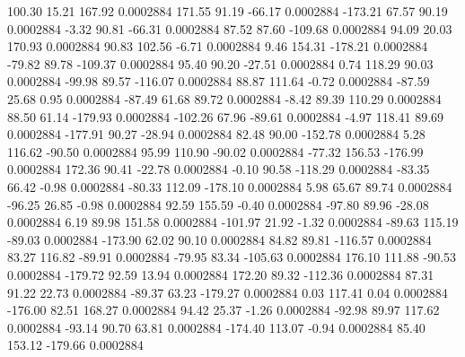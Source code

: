       100.30       15.21      167.92     0.0002884
      171.55       91.19      -66.17     0.0002884
     -173.21       67.57       90.19     0.0002884
       -3.32       90.81      -66.31     0.0002884
       87.52       87.60     -109.68     0.0002884
       94.09       20.03      170.93     0.0002884
       90.83      102.56       -6.71     0.0002884
        9.46      154.31     -178.21     0.0002884
      -79.82       89.78     -109.37     0.0002884
       95.40       90.20      -27.51     0.0002884
        0.74      118.29       90.03     0.0002884
      -99.98       89.57     -116.07     0.0002884
       88.87      111.64       -0.72     0.0002884
      -87.59       25.68        0.95     0.0002884
      -87.49       61.68       89.72     0.0002884
       -8.42       89.39      110.29     0.0002884
       88.50       61.14     -179.93     0.0002884
     -102.26       67.96      -89.61     0.0002884
       -4.97      118.41       89.69     0.0002884
     -177.91       90.27      -28.94     0.0002884
       82.48       90.00     -152.78     0.0002884
        5.28      116.62      -90.50     0.0002884
       95.99      110.90      -90.02     0.0002884
      -77.32      156.53     -176.99     0.0002884
      172.36       90.41      -22.78     0.0002884
       -0.10       90.58     -118.29     0.0002884
      -83.35       66.42       -0.98     0.0002884
      -80.33      112.09     -178.10     0.0002884
        5.98       65.67       89.74     0.0002884
      -96.25       26.85       -0.98     0.0002884
       92.59      155.59       -0.40     0.0002884
      -97.80       89.96      -28.08     0.0002884
        6.19       89.98      151.58     0.0002884
     -101.97       21.92       -1.32     0.0002884
      -89.63      115.19      -89.03     0.0002884
     -173.90       62.02       90.10     0.0002884
       84.82       89.81     -116.57     0.0002884
       83.27      116.82      -89.91     0.0002884
      -79.95       83.34     -105.63     0.0002884
      176.10      111.88      -90.53     0.0002884
     -179.72       92.59       13.94     0.0002884
      172.20       89.32     -112.36     0.0002884
       87.31       91.22       22.73     0.0002884
      -89.37       63.23     -179.27     0.0002884
        0.03      117.41        0.04     0.0002884
     -176.00       82.51      168.27     0.0002884
       94.42       25.37       -1.26     0.0002884
      -92.98       89.97      117.62     0.0002884
      -93.14       90.70       63.81     0.0002884
     -174.40      113.07       -0.94     0.0002884
       85.40      153.12     -179.66     0.0002884
